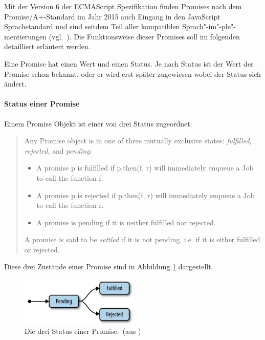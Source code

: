 \documentclass[
11pt, %
a4paper, %
oneside, %
pdfspacing, %
headinclude,
BCOR5mm, %
ngerman, %
bibtotocnumbered,
]{scrartcl}
\begin{document}
			Mit der Version 6 der ECMAScript Spezifikation finden Promises nach dem Promise/A+-Standard im Jahr 2015 auch Eingang in den JavaScript Sprachstandard und sind seitdem Teil aller kompatiblen Sprach"-im"-ple"-mentierungen (vgl.~\citep{EcmaTC39.}). Die Funktionsweise dieser Promises soll im folgenden detailliert erläutert werden.

			
			\skippingparagraph
			Eine Promise hat einen Wert und einen Status. Je nach Status ist der Wert der Promise schon bekannt, oder er wird erst später zugewiesen wobei der Status sich ändert.
			
			\paragraph{Status einer Promise}
			Einem Promise Objekt ist einer von drei Status zugeordnet:
			\begin{quote}Any Promise object is in one of three mutually exclusive states: \emph{fulfilled}, \emph{rejected}, and \emph{pending}:  
				\begin{itemize}[nosep]
					\item A promise \textsf{p }is fulfilled if \textsf{p.then(f, r) }will immediately enqueue a Job to call the function \textsf{f}.
					\item A promise \textsf{p }is rejected if \textsf{p.then(f, r) }will immediately enqueue a Job to call the function \textsf{r}.
					\item A promise is pending if it is neither fulfilled nor rejected.
				\end{itemize}
				A promise is said to be \emph{settled} if it is not pending, i.e. if it is either fulfilled or rejected.~\citep[\S~25.4]{EcmaTC39.}\end{quote}
			Diese drei Zustände einer Promise sind in Abbildung \ref{promiseStates} dargestellt.
			\begin{figure}[h]
				\center
				\includegraphics[width=0.5\textwidth]{Images/Parker2015-JavaScript.jpg}
				\caption[Die drei Status einer Promise]{\label{promiseStates}Die drei Status einer Promise.~(aus \citep[S.~16]{Parker.2015})}
			\end{figure}
			
\end{document}

